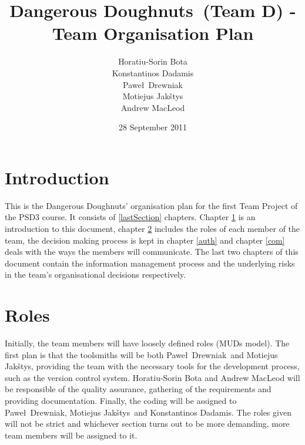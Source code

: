 \documentclass{article}
\newcommand{\pawel}{Pawe\l}
\newcommand{\jakstys}{Jak\v{s}tys}
\newcommand{\dnd}{Dangerous Doughnuts}
\begin{document}
\title{\dnd\ (Team D) - Team Organisation Plan} %
\author{Horatiu-Sorin Bota \\
		Konstantinos Dadamis \\
		\pawel\ Drewniak \\
		Motiejus \jakstys \\
		Andrew MacLeod} 

\date{28 September 2011}
\maketitle

\section{Introduction}
\label{intro}

This is the \dnd' organisation plan for the first Team
Project of the PSD3 course. It consists of \ref{lastSection}
chapters. Chapter \ref{intro} is an introduction to this document,
chapter \ref{role} includes the roles of each member of the team, the decision making process is kept in chapter \ref{auth} and chapter \ref{com} deals with the ways the members will communicate. The last two chapters of this document contain the information management process and the underlying risks in the team's organisational decisions respectively.



\section{Roles}
\label{role}

Initially, the team members will have loosely defined roles (MUDs model). The first plan is that the toolsmiths will be both \pawel\ Drewniak\ and Motiejus \jakstys, providing the team with the necessary tools for the development process, such as the version control system. Horatiu-Sorin Bota and Andrew MacLeod will be responsible of the quality assurance, gathering of the requirements and providing documentation. Finally, the coding will be assigned to \pawel\ Drewniak, Motiejus \jakstys\ and Konstantinos Dadamis. The roles given will not be strict and whichever section turns out to be more demanding, more team members will be assigned to it.  
\end{document}
